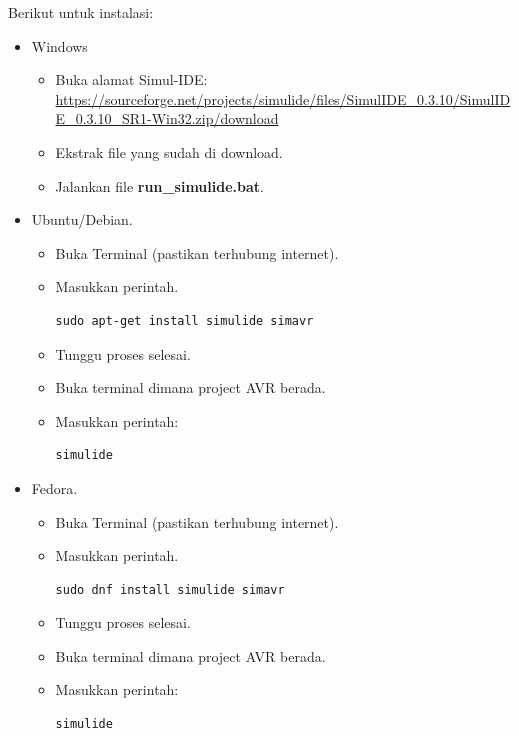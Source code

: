 \documentclass[12pt,]{article}
\begin{document}
	Berikut untuk instalasi:
	\begin{itemize}
		\item Windows
		\begin{itemize}
			\item Buka alamat Simul-IDE:\\
			\url{https://sourceforge.net/projects/simulide/files/SimulIDE_0.3.10/SimulIDE_0.3.10_SR1-Win32.zip/download}
			\item Ekstrak file yang sudah di download.
			\item Jalankan file \textbf{run\_simulide.bat}.
		\end{itemize}
	
		\item Ubuntu/Debian.
		\begin{itemize}
			\item Buka Terminal (pastikan terhubung internet).
			\item Masukkan perintah.
			\begin{verbatim}
sudo apt-get install simulide simavr
			\end{verbatim}
			\item Tunggu proses selesai.
			\item Buka terminal dimana project AVR berada.
			\item Masukkan perintah:
			\begin{verbatim}
simulide
			\end{verbatim}
		\end{itemize}
	
		\item Fedora.
		\begin{itemize}
			\item Buka Terminal (pastikan terhubung internet).
			\item Masukkan perintah.
			\begin{verbatim}
sudo dnf install simulide simavr
			\end{verbatim}
			\item Tunggu proses selesai.
			\item Buka terminal dimana project AVR berada.
			\item Masukkan perintah:
			\begin{verbatim}
simulide
			\end{verbatim}
		\end{itemize}
	

\end{itemize}
\end{document}
